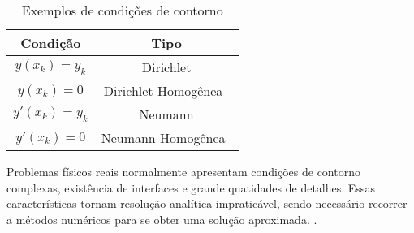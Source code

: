 \begin{table}	
	\centering
	\begin{tabular}{|c|c|}	
		\hline
		\textbf{Condição} 
		& \textbf{Tipo} \\	
		\hline
		$y(x_k) = y_k $ 
		& Dirichlet \\
		\hline
		$y(x_k) = 0$
		& Dirichlet Homogênea\  \\
		\hline
		$y'(x_k) = y_k$
		& Neumann \\
		\hline
		$y'(x_k) = 0$
		& Neumann Homogênea\  \\
		\hline
	\end{tabular}
	\caption{Exemplos de condições de contorno}
	\label{tab:cond}
\end{table}


Problemas físicos reais normalmente apresentam  condições de contorno complexas, existência de interfaces e grande quatidades de detalhes. Essas características tornam resolução analítica impraticável, sendo necessário recorrer a métodos numéricos para se obter uma solução aproximada.
\citep[p. 397]{powers}.


